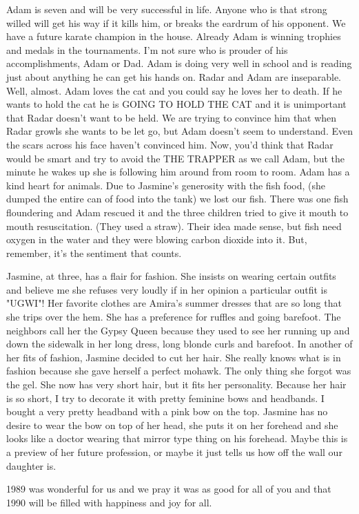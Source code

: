 Adam is seven and will be very successful in life. Anyone who is that strong willed will get his way if it kills him, or breaks the eardrum of
his opponent. We have a future karate champion in the house. Already Adam is winning trophies and medals in the tournaments. I'm not sure who is
prouder of his accomplishments, Adam or Dad. Adam is doing very well in school and is reading just about anything he can get his hands on. Radar
and Adam are inseparable. Well, almost. Adam loves the cat and you could say he loves her to death. If he wants to hold the cat he is GOING TO
HOLD THE CAT and it is unimportant that Radar doesn't want to be held. We are trying to convince him that when Radar growls she wants to be let
go, but Adam doesn't seem to understand. Even the scars across his face haven't convinced him. Now, you'd think that Radar would be smart and
try to avoid the THE TRAPPER as we call Adam, but the minute he wakes up she is following him around from room to room. Adam has a kind heart
for animals. Due to Jasmine's generosity with the fish food, (she dumped the entire can of food into the tank) we lost our fish. There was one
fish floundering and Adam rescued it and the three children tried to give it mouth to mouth resuscitation. (They used a straw). Their idea made
sense, but fish need oxygen in the water and they were blowing carbon dioxide into it. But, remember, it's the sentiment that counts.

Jasmine, at three, has a flair for fashion. She insists on wearing certain outfits and believe me she refuses very loudly if in her opinion a
particular outfit is "UGWI"! Her favorite clothes are Amira's summer dresses that are so long that she trips over the hem. She has a preference
for ruffles and going barefoot. The neighbors call her the Gypsy Queen because they used to see her running up and down the sidewalk in her long
dress, long blonde curls and barefoot. In another of her fits of fashion, Jasmine decided to cut her hair. She really knows what is in fashion
because she gave herself a perfect mohawk. The only thing she forgot was the gel. She now has very short hair, but it fits her personality.
Because her hair is so short, I try to decorate it with pretty feminine bows and headbands. I bought a very pretty headband with a pink bow on
the top. Jasmine has no desire to wear the bow on top of her head, she puts it on her forehead and she looks like a doctor wearing that mirror
type thing on his forehead. Maybe this is a preview of her future profession, or maybe it just tells us how off the wall our daughter is.

1989 was wonderful for us and we pray it was as good for all of you and that 1990 will be filled with happiness and joy for all.



%
